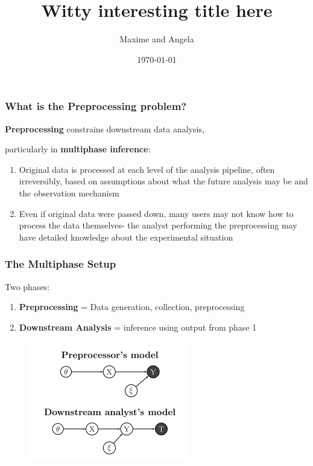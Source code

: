\documentclass[10pt, compress]{beamer}
\title{Witty interesting title here}
\subtitle{}
\date{\today}
\author{Maxime and Angela}
\begin{document}
\maketitle

\begin{frame}[fragile]
    \frametitle{What is the Preprocessing problem?}
  
  \begin{center}
    \textbf{Preprocessing} constrains downstream data analysis, 
    
    particularly in \textbf{multiphase inference}:
  \end{center}
  
    \begin{enumerate}[<+->]
    \item Original data is processed at each level of the analysis pipeline, often irreversibly, based on assumptions about what the future analysis may be and the observation mechanism
    \vspace*{5mm}
    \item Even if original data were passed down, many users may not know how to process the data themselves- the analyst performing the preprocessing may have detailed knowledge about the experimental situation
  \end{enumerate}
  
\end{frame}

\begin{frame}[fragile]
    \frametitle{The Multiphase Setup}

    Two phases:
    \begin{enumerate}
    \item \textbf{Preprocessing} = Data generation, collection, preprocessing
    \item \textbf{Downstream Analysis} = inference using output from phase 1
    \end{enumerate}
    
    \begin{figure}[h!]
    \centering
    \includegraphics[width=.6\textwidth]{two_phase_setting.png}
    \end{figure}

\end{frame}
\end{document}
